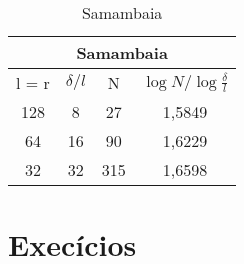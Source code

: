 \begin{table}[h]
    \centering
        \begin{tabular}{| c | c | c | c |}
             \multicolumn{4}{c}{Samambaia} \\
             \hline
             l = r & $\delta/l$ & N & $\log{N}/\log{\frac{\delta}{l}}$ \\
             \hline
             128 & 8 & 27 & 1,5849 \\
             \hline
             64 & 16 & 90 & 1,6229 \\
             \hline
             32 & 32 & 315 & 1,6598 \\
             \hline 
        \end{tabular}
    \caption{Samambaia}
    \label{tab:sam}
\end{table}

\section{Execícios}